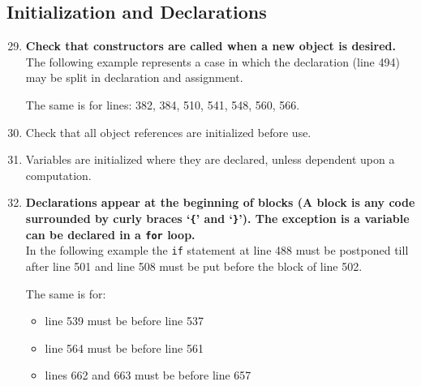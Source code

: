 \documentclass[a4paper,11pt]{report} %
\begin{document}
		\subsection*{Initialization and Declarations}\begin{enumerate}[resume]
			\setcounter{enumi}{28}
			\setcounter{enumi}{29}
			\item \textbf{Check that constructors are called when a new object is desired.}\smallskip \\
				The following example represents a case in which the declaration (line 494) may be split in declaration and assignment.
				
				The same is for lines: 382, 384, 510, 541, 548, 560, 566.
			\item Check that all object references are initialized before use.
			\item Variables are initialized where they are declared, unless dependent upon a computation.
			\item \textbf{Declarations appear at the beginning of blocks (A block is any code surrounded by curly braces `\texttt{\{}' and `\texttt{\}}'). The exception is a variable can be declared in a \texttt{for} loop.} \smallskip \\
				In the following example the \texttt{if} statement at line 488 must be postponed till after line 501 and line 508 must be put before the block of line 502.
				
				The same is for:
				\begin{itemize}
					\item line 539 must be before line 537
					\item line 564 must be before line 561
					\item lines 662 and 663 must be before line 657
				\end{itemize}
		\end{enumerate}
		
\end{document}
